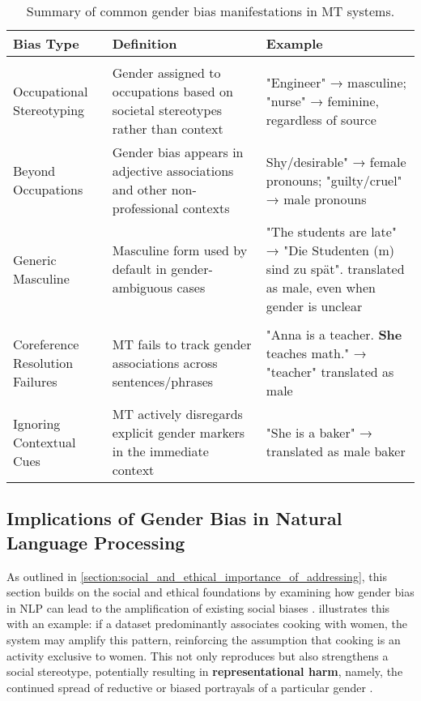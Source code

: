 \begin{table}[ht]
\centering
\begin{tabularx}{\textwidth}{>{\raggedright\arraybackslash}p{3cm} >{\raggedright\arraybackslash}X >{\raggedright\arraybackslash}X}
\toprule
\textbf{Bias Type} & \textbf{Definition} & \textbf{Example} \\
\midrule
\multicolumn{3}{l}{\textbf{Stereotype-Driven Biases}} \\
\midrule
Occupational Stereotyping & Gender assigned to occupations based on societal stereotypes rather than context & "Engineer" → masculine; "nurse" → feminine, regardless of source \\
\addlinespace
Beyond Occupations & Gender bias appears in adjective associations and other non-professional contexts & Shy/desirable" → female pronouns; "guilty/cruel" → male pronouns \\
\addlinespace
Generic Masculine & Masculine form used by default in gender-ambiguous cases & "The students are late" → "Die Studenten (m) sind zu spät". translated as male, even when gender is unclear \\
\midrule
\multicolumn{3}{l}{\textbf{Contextual Failures}} \\
\midrule
Coreference Resolution Failures & MT fails to track gender associations across sentences/phrases & "Anna is a teacher. \textbf{She} teaches math." → "teacher" translated as male \\
\addlinespace
Ignoring Contextual Cues & MT actively disregards explicit gender markers in the immediate context & "She is a baker" → translated as male baker \\
\bottomrule
\end{tabularx}
\caption{Summary of common gender bias manifestations in MT systems.}
\label{tab:gender_biases}
\end{table}


\subsection{Implications of Gender Bias in Natural Language Processing} \label{subsection:implications_of_gb_in_nlp}
As outlined in \autoref{section:social_and_ethical_importance_of_addressing}, this section builds on the social and ethical foundations by examining how gender bias in NLP can lead to the amplification of existing social biases \citep{rescignoGenderBiasMachine2023}.
\citet{ullmannGenderBiasMachine2022} illustrates this with an example: if a dataset predominantly associates cooking with women, the system may amplify this pattern, reinforcing the assumption that cooking is an activity exclusive to women. This not only reproduces but also strengthens a social stereotype, potentially resulting in \textbf{representational harm}, namely, the continued spread of reductive or biased portrayals of a particular gender \citep{stanczakSurveyGenderBias2021}. 

